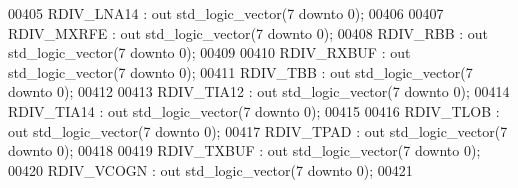 \begin{DoxyCode}
00405         RDIV\_LNA14      : \textcolor{keywordflow}{out} \textcolor{comment}{std\_logic\_vector}(\textcolor{vhdllogic}{}\textcolor{vhdllogic}{7} \textcolor{keywordflow}{downto} \textcolor{vhdllogic}{}\textcolor{vhdllogic}{0});
00406 
00407         RDIV\_MXRFE      : \textcolor{keywordflow}{out} \textcolor{comment}{std\_logic\_vector}(\textcolor{vhdllogic}{}\textcolor{vhdllogic}{7} \textcolor{keywordflow}{downto} \textcolor{vhdllogic}{}\textcolor{vhdllogic}{0});
00408         RDIV\_RBB        : \textcolor{keywordflow}{out} \textcolor{comment}{std\_logic\_vector}(\textcolor{vhdllogic}{}\textcolor{vhdllogic}{7} \textcolor{keywordflow}{downto} \textcolor{vhdllogic}{}\textcolor{vhdllogic}{0});
00409 
00410         RDIV\_RXBUF      : \textcolor{keywordflow}{out} \textcolor{comment}{std\_logic\_vector}(\textcolor{vhdllogic}{}\textcolor{vhdllogic}{7} \textcolor{keywordflow}{downto} \textcolor{vhdllogic}{}\textcolor{vhdllogic}{0});
00411         RDIV\_TBB            : \textcolor{keywordflow}{out} \textcolor{comment}{std\_logic\_vector}(\textcolor{vhdllogic}{}\textcolor{vhdllogic}{7} \textcolor{keywordflow}{downto} \textcolor{vhdllogic}{}\textcolor{vhdllogic}{0});
00412 
00413         RDIV\_TIA12      : \textcolor{keywordflow}{out} \textcolor{comment}{std\_logic\_vector}(\textcolor{vhdllogic}{}\textcolor{vhdllogic}{7} \textcolor{keywordflow}{downto} \textcolor{vhdllogic}{}\textcolor{vhdllogic}{0});
00414         RDIV\_TIA14      : \textcolor{keywordflow}{out} \textcolor{comment}{std\_logic\_vector}(\textcolor{vhdllogic}{}\textcolor{vhdllogic}{7} \textcolor{keywordflow}{downto} \textcolor{vhdllogic}{}\textcolor{vhdllogic}{0});
00415 
00416         RDIV\_TLOB           : \textcolor{keywordflow}{out} \textcolor{comment}{std\_logic\_vector}(\textcolor{vhdllogic}{}\textcolor{vhdllogic}{7} \textcolor{keywordflow}{downto} \textcolor{vhdllogic}{}\textcolor{vhdllogic}{0});
00417         RDIV\_TPAD           : \textcolor{keywordflow}{out} \textcolor{comment}{std\_logic\_vector}(\textcolor{vhdllogic}{}\textcolor{vhdllogic}{7} \textcolor{keywordflow}{downto} \textcolor{vhdllogic}{}\textcolor{vhdllogic}{0});
00418 
00419         RDIV\_TXBUF      : \textcolor{keywordflow}{out} \textcolor{comment}{std\_logic\_vector}(\textcolor{vhdllogic}{}\textcolor{vhdllogic}{7} \textcolor{keywordflow}{downto} \textcolor{vhdllogic}{}\textcolor{vhdllogic}{0});
00420         RDIV\_VCOGN      : \textcolor{keywordflow}{out} \textcolor{comment}{std\_logic\_vector}(\textcolor{vhdllogic}{}\textcolor{vhdllogic}{7} \textcolor{keywordflow}{downto} \textcolor{vhdllogic}{}\textcolor{vhdllogic}{0});
00421 

\end{DoxyCode}
